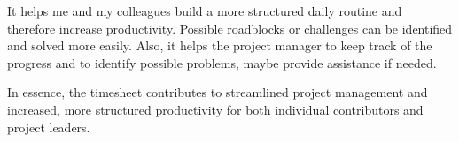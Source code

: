 It helps me and my colleagues build a more structured daily routine and therefore increase productivity. Possible roadblocks or challenges can be identified and solved more easily.
Also, it helps the project manager to keep track of the progress and to identify possible problems, maybe provide assistance if needed.

In essence, the timesheet contributes to streamlined project management and increased, more structured productivity for both individual contributors and project leaders.